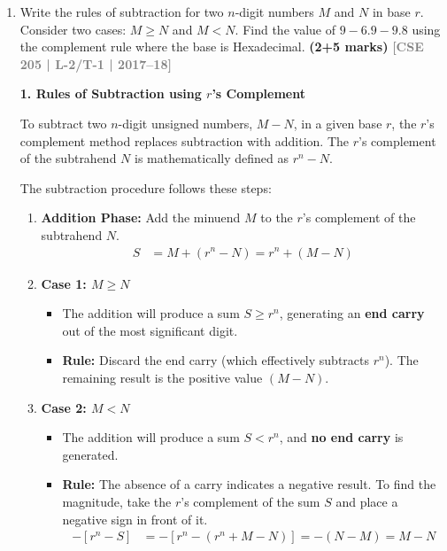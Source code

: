 \documentclass[12pt,a3paper]{article}
\newcommand{\yr}[1]{\hfill\textcolor{gray}{\small\textbf{[#1]}}}
\newcommand{\mk}[1]{\textcolor{orange!70!black}{\small\textbf{(#1 marks)}}}
\begin{document}
\begin{enumerate}
\begin{tcolorbox}[enhanced,breakable,ansbox,colback=cD!4,colframe=cD,boxrule=0.8pt,arc=5pt,title={\textbf{Answer}},fonttitle=\bfseries\color{white},colbacktitle=cD]
\end{tcolorbox}

\item Write the rules of subtraction for two $n$-digit numbers $M$ and $N$ in base $r$. Consider two cases: $M \geq N$ and $M < N$. Find the value of $9 - 6.9 - 9.8$ using the complement rule where the base is Hexadecimal.
\mk{2+5} \yr{CSE 205 | L-2/T-1 | 2017--18}

\begin{tcolorbox}[enhanced,breakable,ansbox,colback=cD!4,colframe=cD,boxrule=0.8pt,arc=5pt,title={\textbf{Answer}},fonttitle=\bfseries\color{white},colbacktitle=cD]

\textbf{\textcolor{cD}{1. Rules of Subtraction using $r$'s Complement}}

To subtract two $n$-digit unsigned numbers, $M - N$, in a given base $r$, the $r$'s complement method replaces subtraction with addition. The $r$'s complement of the subtrahend $N$ is mathematically defined as $r^n - N$. 

The subtraction procedure follows these steps:
\begin{enumerate}
    \item \textbf{Addition Phase:} Add the minuend $M$ to the $r$'s complement of the subtrahend $N$.
    \begin{align*}
        S &= M + (r^n - N) = r^n + (M - N)
    \end{align*}
    \item \textbf{Case 1: $M \geq N$}
    \begin{itemize}
        \item The addition will produce a sum $S \geq r^n$, generating an \textbf{end carry} out of the most significant digit.
        \item \textbf{Rule:} Discard the end carry (which effectively subtracts $r^n$). The remaining result is the positive value $(M - N)$.
    \end{itemize}
    \item \textbf{Case 2: $M < N$}
    \begin{itemize}
        \item The addition will produce a sum $S < r^n$, and \textbf{no end carry} is generated.
        \item \textbf{Rule:} The absence of a carry indicates a negative result. To find the magnitude, take the $r$'s complement of the sum $S$ and place a negative sign in front of it.
        \begin{align*}
            -\left[ r^n - S \right] &= -\left[ r^n - (r^n + M - N) \right] = -(N - M) = M - N
        \end{align*}
    \end{itemize}
\end{enumerate}


\end{tcolorbox}
\end{enumerate}
\end{document}
